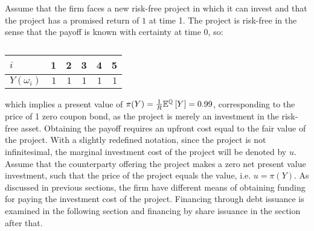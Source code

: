 \documentclass[main.tex]{subfiles}
\begin{document}
    Assume that the firm faces a new risk-free project in which it can invest
    and that the project has a promised return of $\num{1}$ at time 1.
    The project is risk-free in the sense that the payoff is known with certainty at time 0, so:
        \begin{table}[H]
            \centering
            \begin{tabular}{l|rrrrr}
                $i$ & 1 & 2 & 3 & 4 & 5 \\
                \hline
                $Y(\omega_{i})$ & $\num{1}$ & $\num{1}$ & $\num{1}$ & $\num{1}$ & $\num{1}$
            \end{tabular}
            \caption{}
        \end{table}
    which implies a present value of 
    $\pi(Y) = \frac{1}{R} \mathbb{E}^{\mathbb{Q}}\left[Y\right] = \num{0.99}$, 
    corresponding to the price of 1 zero coupon bond, 
    as the project is merely an investment in the risk-free asset.
    Obtaining the payoff requires an upfront cost equal to the fair value of the project.
    With a slightly redefined notation, since the project is not infinitesimal,
    the marginal investment cost of the project will be denoted by $u$.
    Assume that the counterparty offering the project makes a zero net present value investment, 
    such that the price of the project equals the value, i.e. $u = \pi(Y)$.
    As discussed in previous sections, the firm have different means of obtaining funding
    for paying the investment cost of the project.
    Financing through debt issuance is examined in the following section 
    and financing by share issuance in the section after that.
\end{document}
